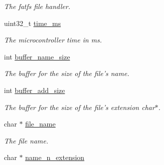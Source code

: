 \begin{DoxyCompactItemize}
\begin{DoxyCompactList}\small\item\em The fatfs file handler. \end{DoxyCompactList}\item 
\hypertarget{structdata__logging__t_a52deba62e6af2e1db7a64cbdce3d0a45}{uint32\+\_\+t \hyperlink{structdata__logging__t_a52deba62e6af2e1db7a64cbdce3d0a45}{time\+\_\+ms}}\label{structdata__logging__t_a52deba62e6af2e1db7a64cbdce3d0a45}

\begin{DoxyCompactList}\small\item\em The microcontroller time in ms. \end{DoxyCompactList}\item 
\hypertarget{structdata__logging__t_a2c16688b518234c8d04279ab2e15b995}{int \hyperlink{structdata__logging__t_a2c16688b518234c8d04279ab2e15b995}{buffer\+\_\+name\+\_\+size}}\label{structdata__logging__t_a2c16688b518234c8d04279ab2e15b995}

\begin{DoxyCompactList}\small\item\em The buffer for the size of the file's name. \end{DoxyCompactList}\item 
\hypertarget{structdata__logging__t_ae7b1403576bd736f34a028a86e5ff40c}{int \hyperlink{structdata__logging__t_ae7b1403576bd736f34a028a86e5ff40c}{buffer\+\_\+add\+\_\+size}}\label{structdata__logging__t_ae7b1403576bd736f34a028a86e5ff40c}

\begin{DoxyCompactList}\small\item\em The buffer for the size of the file's extension char$\ast$. \end{DoxyCompactList}\item 
\hypertarget{structdata__logging__t_a9bb0a642bc6d354de128a0c7b46994d4}{char $\ast$ \hyperlink{structdata__logging__t_a9bb0a642bc6d354de128a0c7b46994d4}{file\+\_\+name}}\label{structdata__logging__t_a9bb0a642bc6d354de128a0c7b46994d4}

\begin{DoxyCompactList}\small\item\em The file name. \end{DoxyCompactList}\item 
\hypertarget{structdata__logging__t_a4664c6ec88c6962fd90d53404b153ffb}{char $\ast$ \hyperlink{structdata__logging__t_a4664c6ec88c6962fd90d53404b153ffb}{name\+\_\+n\+\_\+extension}}\label{structdata__logging__t_a4664c6ec88c6962fd90d53404b153ffb}


\end{DoxyCompactItemize}
